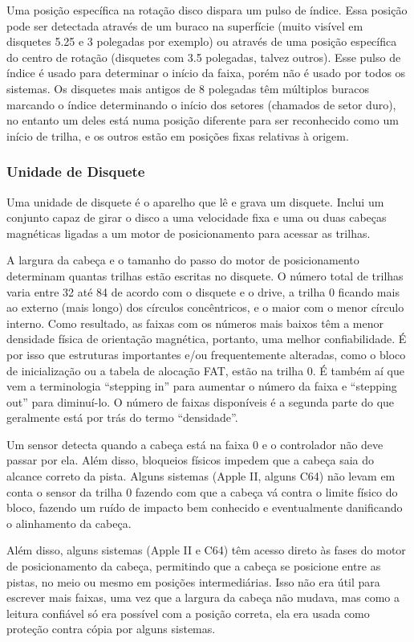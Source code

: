 \documentclass[letterpaper,10pt,brazil]{sphinxmanual}
\begin{document}
Uma posição específica na rotação disco dispara um pulso de índice.
Essa posição pode ser detectada através de um buraco na superfície
(muito visível em disquetes 5.25 e 3 polegadas por exemplo) ou através
de uma posição específica do centro de rotação (disquetes com 3.5
polegadas, talvez outros). Esse pulso de índice é usado para determinar
o início da faixa, porém não é usado por todos os sistemas. Os disquetes
mais antigos de 8 polegadas têm múltiplos buracos marcando o índice
determinando o início dos setores (chamados de setor duro), no entanto
um deles está numa posição diferente para ser reconhecido como um início
de trilha, e os outros estão em posições fixas relativas à origem.


\subsubsection{Unidade de Disquete}
\label{techspecs/floppy:unidade-de-disquete}
Uma unidade de disquete é o aparelho que lê e grava um disquete. Inclui
um conjunto capaz de girar o disco a uma velocidade fixa e uma ou duas
cabeças magnéticas ligadas a um motor de posicionamento para acessar as
trilhas.

A largura da cabeça e o tamanho do passo do motor de posicionamento
determinam quantas trilhas estão escritas no disquete. O número total de
trilhas varia entre 32 até 84 de acordo com o disquete e o drive, a
trilha 0 ficando mais ao externo (mais longo) dos círculos concêntricos,
e o maior com o menor círculo interno. Como resultado, as faixas com os
números mais baixos têm a menor densidade física de orientação
magnética, portanto, uma melhor confiabilidade. É por isso que
estruturas importantes e/ou frequentemente alteradas, como o bloco de
inicialização ou a tabela de alocação FAT, estão na trilha 0. É também
aí que vem a terminologia ``stepping in'' para aumentar o número da faixa
e ``stepping out'' para diminuí-lo. O número de faixas disponíveis é a
segunda parte do que geralmente está por trás do termo ``densidade''.

Um sensor detecta quando a cabeça está na faixa 0 e o controlador não
deve passar por ela. Além disso, bloqueios físicos impedem que a cabeça
saia do alcance correto da pista. Alguns sistemas (Apple II, alguns C64)
não levam em conta o sensor da trilha 0 fazendo com que a cabeça vá
contra o limite físico do bloco, fazendo um ruído de impacto bem
conhecido e eventualmente danificando o alinhamento da cabeça.

Além disso, alguns sistemas (Apple II e C64) têm acesso direto às fases
do motor de posicionamento da cabeça, permitindo que a cabeça se
posicione entre as pistas, no meio ou mesmo em posições intermediárias.
Isso não era útil para escrever mais faixas, uma vez que a largura da
cabeça não mudava, mas como a leitura confiável só era possível com a
posição correta, ela era usada como proteção contra cópia por alguns
sistemas.
\end{document}

